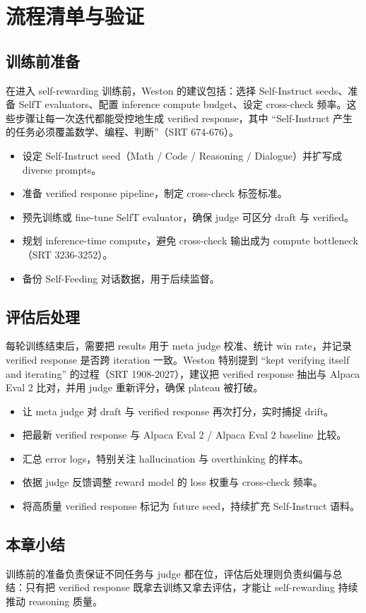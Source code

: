 \section{流程清单与验证}
\subsection{训练前准备}
在进入 self-rewarding 训练前，Weston 的建议包括：选择 Self-Instruct seeds、准备 SelfT evaluators、配置 inference compute budget、设定 cross-check 频率。这些步骤让每一次迭代都能受控地生成 verified response，其中 ``Self-Instruct 产生的任务必须覆盖数学、编程、判断''（SRT 674-676）。

\begin{itemize}
    \item 设定 Self-Instruct seed（Math / Code / Reasoning / Dialogue）并扩写成 diverse prompts。
    \item 准备 verified response pipeline，制定 cross-check 标签标准。
    \item 预先训练或 fine-tune SelfT evaluator，确保 judge 可区分 draft 与 verified。
    \item 规划 inference-time compute，避免 cross-check 输出成为 compute bottleneck（SRT 3236-3252）。
    \item 备份 Self-Feeding 对话数据，用于后续监督。
\end{itemize}

\subsection{评估后处理}
每轮训练结束后，需要把 results 用于 meta judge 校准、统计 win rate，并记录 verified response 是否跨 iteration 一致。Weston 特别提到 ``kept verifying itself and iterating'' 的过程（SRT 1908-2027），建议把 verified response 抽出与 Alpaca Eval 2 比对，并用 judge 重新评分，确保 plateau 被打破。

\begin{itemize}
    \item 让 meta judge 对 draft 与 verified response 再次打分，实时捕捉 drift。
    \item 把最新 verified response 与 Alpaca Eval 2 / Alpaca Eval 2 baseline 比较。
    \item 汇总 error logs，特别关注 hallucination 与 overthinking 的样本。
    \item 依据 judge 反馈调整 reward model 的 loss 权重与 cross-check 频率。
    \item 将高质量 verified response 标记为 future seed，持续扩充 Self-Instruct 语料。
\end{itemize}

\subsection{本章小结}
训练前的准备负责保证不同任务与 judge 都在位，评估后处理则负责纠偏与总结：只有把 verified response 既拿去训练又拿去评估，才能让 self-rewarding 持续推动 reasoning 质量。

